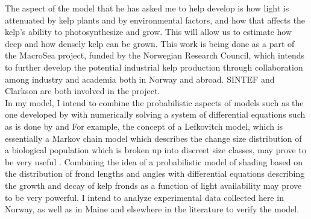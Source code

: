 \documentclass{article}
\begin{document}
The aspect of the model that he has asked me to help develop is how light is attenuated by kelp plants and by environmental factors, and how that affects the kelp's ability to photosynthesize and grow. 
This will allow us to estimate how deep and how densely kelp can be grown. This work is being done as a part of the MacroSea project, funded by the Norwegian Research Council, which intends to further develop the potential industrial kelp production through collaboration among industry and academia both in Norway and abroad. SINTEF and Clarkson are both involved in the project. \\[-0.75em]

In my model, I intend to combine the probabilistic aspects of models such as the one developed by \cite{burgman_stage-structured_1990} with numerically solving a system of differential equations such as is done by \cite{anderson_mathematical_1974} and \cite{broch_modelling_2012}
For example, the concept of a Lefkovitch model, which is essentially a Markov chain model which describes the change size distribution of a biological population which is broken up into discreet size classes, may prove to be very useful \citep{caswell_matrix_1983}. Combining the idea of a probabilistic model of shading based on the distribution of frond lengths and angles with differential equations describing the growth and decay of kelp fronds as a function of light availability may prove to be very powerful. I intend to analyze experimental data collected here in Norway, as well as in Maine and elsewhere in the literature to verify the model. \\[-0.75em]



\end{document}
